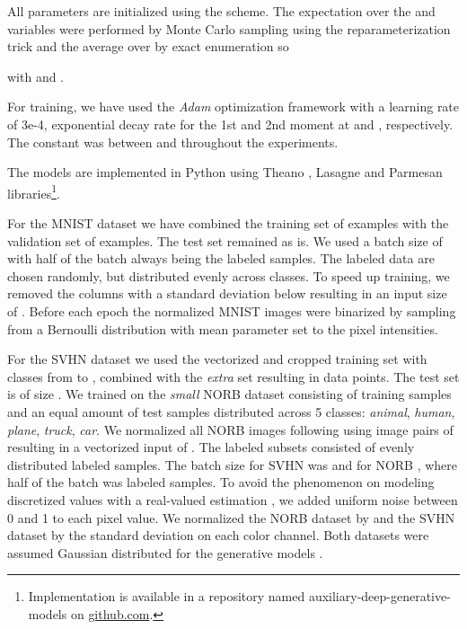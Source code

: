 \documentclass{article}
\begin{document}
All parameters are initialized using the \citet{Glorot10} scheme. The expectation over the  and  variables were performed by Monte Carlo sampling using the reparameterization trick \citep{Kingma13,Rezende14} and the average over  by exact enumeration so 

with  and .

For training, we have used the \textit{Adam} \citep{Kingma14a} optimization framework with a learning rate of 3e-4, exponential decay rate for the 1st and 2nd moment at  and , respectively. The  constant was between  and  throughout the experiments.

The models are implemented in Python using Theano \citep{Bastien12}, Lasagne \citep{Dieleman15} and Parmesan libraries\footnote{Implementation is available in a repository named auxiliary-deep-generative-models on \url{github.com}.}. 

For the MNIST dataset we have combined the training set of  examples with the validation set of  examples. The test set remained as is. We used a batch size of  with half of the batch always being the  labeled samples. The labeled data are chosen randomly, but distributed evenly across classes. To speed up training, we removed the columns with a standard deviation below  resulting in an input size of . Before each epoch the normalized MNIST images were binarized by sampling from a Bernoulli distribution with mean parameter set to the pixel intensities.

For the SVHN dataset we used the vectorized and cropped training set  with classes from  to , combined with the \textit{extra} set resulting in  data points. The test set is of size . We trained on the \textit{small} NORB dataset consisting of  training samples and an equal amount of test samples distributed across 5 classes: \textit{animal}, \textit{human}, \textit{plane}, \textit{truck}, \textit{car}. We normalized all NORB images following \citet{Miyato15} using image pairs of  resulting in a vectorized input of . The labeled subsets consisted of  evenly distributed labeled samples. The batch size for SVHN was  and for NORB , where half of the batch was labeled samples. To avoid the phenomenon on modeling discretized values with a real-valued estimation \citep{Uria2013}, we added uniform noise between 0 and 1 to each pixel value. We normalized the NORB dataset by  and the SVHN dataset by the standard deviation on each color channel. Both datasets were assumed Gaussian distributed for the generative models .
\end{document}
